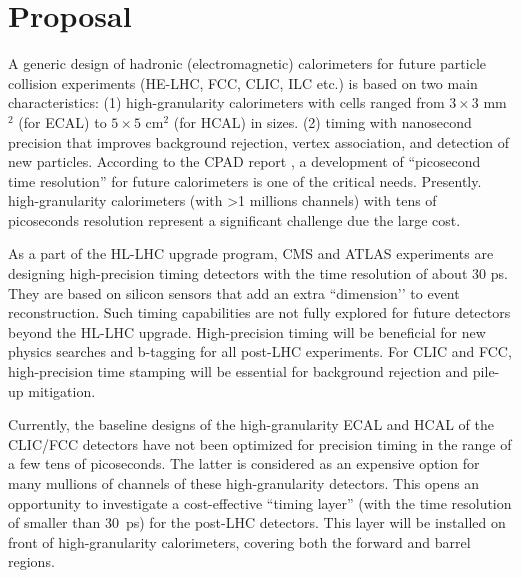 \documentclass[final,1p,11pt]{elsarticle}
\begin{document}
\section{Proposal}

A generic design of hadronic (electromagnetic) calorimeters for future particle collision experiments (HE-LHC, FCC, CLIC, ILC etc.) 
is based on two main characteristics: (1) high-granularity calorimeters with cells ranged from $3\times 3$ mm$^2$ (for ECAL) to $5\times 5$ cm$^2$  (for HCAL) in sizes.
(2) timing with nanosecond precision that improves background rejection, vertex association, and detection of new particles. 
According to the CPAD report \cite{Ahmed:2019sim}, a development of “picosecond time resolution” for future calorimeters is one of the critical needs. 
Presently. high-granularity calorimeters (with >1 millions channels) with tens of picoseconds resolution represent a 
significant challenge due the large cost.

As a part of the HL-LHC upgrade program, CMS and ATLAS experiments are designing high-precision timing detectors with the time resolution of about 30 ps. 
They are based on silicon sensors that add an extra ``dimension’’ to event reconstruction. 
Such timing capabilities are not fully explored for future detectors beyond the HL-LHC upgrade. 
High-precision timing will be beneficial for new physics searches and b-tagging for all post-LHC experiments. 
For CLIC and FCC, high-precision time stamping will be essential for background rejection and pile-up mitigation. 

Currently, the baseline designs of the high-granularity ECAL and HCAL of the CLIC/FCC detectors have not been 
optimized for precision timing in the range of a few tens of picoseconds. 
The latter is considered as an expensive option for many mullions of channels of these high-granularity detectors. 
This opens an opportunity to investigate a cost-effective “timing layer” (with the time resolution of smaller than 30~ps) for the post-LHC detectors. 
This layer will be installed on front of high-granularity calorimeters, covering both the forward and barrel regions.
\end{document}
